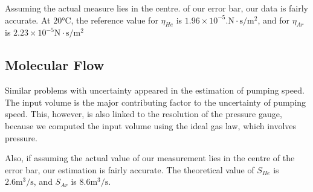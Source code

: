 \documentclass[12pt,a4paper]{article}
\begin{document}
	Assuming the actual measure lies in the centre. of our error bar, our data is fairly accurate. At $20\si{\celsius}$, the reference value for $\eta_{He}$ is $1.96 \times 10^{-5}. \si{\newton\cdot\second\per\metre^2}$, and for $\eta_{Ar}$ is $2.23 \times 10^{-5} \si{\newton\cdot\second\per\metre^2}$ 
	
	\subsection{Molecular Flow}
	Similar problems with uncertainty appeared in the estimation of pumping speed. The input volume is the major contributing factor to the uncertainty of pumping speed. This, however, is also linked to the resolution of the pressure gauge, because we computed the input volume using the ideal gas law, which involves pressure.	
	
	Also, if assuming the actual value of our measurement lies in the centre of the error bar, our estimation is fairly accurate. The theoretical value of $S_{He}$ is $2.6\si{\meter^3\per\second}$, and $S_{Ar}$ is $8.6\si{\meter^3\per\second}$.\cite{Viscosity}
	 
	
	
\printbibliography
	
\end{document}
